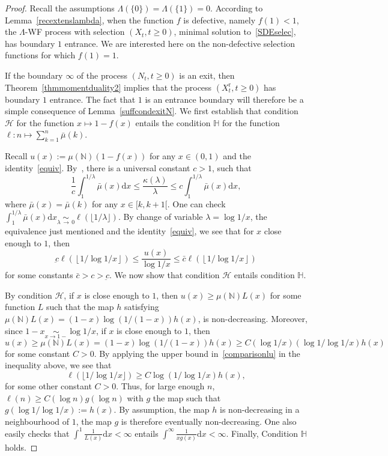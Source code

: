 \documentclass[10pt]{amsart}
\theoremstyle{definition}\newtheorem{defi}[theo]{Definition}\newtheorem{rema}[theo]{Remark}\newtheorem{exam}[theo]{Example}\newtheorem{exem}[theo]{Example}\newtheorem{nota}[theo]{Notation}
\newcommand{\ddr}{\mathrm{d}}
\newcommand{\rmr}{\mathrm{r}}
\newcommand{\bbN}{\mathbb{N}}
\newcommand{\bbH}{\mathbb{H}}
\newcommand{\clH}{\mathcal{H}}
\begin{document}
\begin{proof}
Recall the assumptions $\Lambda(\{0\})=\Lambda(\{1\})=0$. According to Lemma~\ref{recextenslambda}, when the function $f$ is defective, namely $f(1)<1$, the $\Lambda$-WF process with selection $(X_t,t\geq 0)$, minimal solution to~\eqref{SDEselec}, has boundary $1$ entrance. We are interested here on the non-defective selection functions for which $f(1)=1$.


If the boundary $\infty$ of the process $(N_t,t\geq 0)$ is an exit, then Theorem~\ref{thmmomentduality2} implies that the process $(X_t^{\rmr},t\geq 0)$ has boundary $1$ entrance. The fact that $1$ is an entrance boundary will therefore be a simple consequence of Lemma~\ref{suffcondexitN}. We first establish that condition $\clH$ for the function $x\mapsto 1-f(x)$ entails the condition $\bbH$ for the function $\ell :n\mapsto \sum_{k=1}^{n}\bar{\mu}(k)$.

Recall $u(x):=\mu(\bbN)(1-f(x))$ for any $x\in (0,1)$ and the identity~\eqref{equiv}. By~\cite[Proposition~1, Chapter~III]{Bertoin96}, there is a universal constant $c>1$, such that
\[
\frac{1}{c}\int_{1}^{1/\lambda}\bar{\mu}(x)\ddr x \leq \frac{\kappa(\lambda)}{\lambda}\leq c \int_{1}^{1/\lambda}\bar{\mu}(x)\ddr x,
\]
where $\bar{\mu}(x)=\bar{\mu}(k)$ for any $x\in [k,k+1[$. One can check $\int_{1}^{1/\lambda}\bar{\mu}(x)\ddr x \underset{\lambda\,\rightarrow\,0}{\sim} \ell(\lfloor 1/\lambda \rfloor).$ By change of variable $\lambda=\log 1/x$, the equivalence just mentioned and the identity~\eqref{equiv}, we see that for $x$ close enough to $1$, then
\begin{equation}\label{comparisonlu}
\underbar c \ell\left(\left \lfloor 1/\log 1/x \right \rfloor \right)\leq \frac{u(x)}{\log 1/x}\leq \bar c \ell\left(\left \lfloor 1/\log 1/x \right \rfloor \right)
\end{equation}
for some constants $\bar c>c>\underbar c $. We now show that condition $\clH$ entails condition $\bbH$.

By condition $\clH$, if $x$ is close enough to $1$, then $u(x)\geq \mu(\bbN)L(x)$ for some function $L$ such that the map $h$ satisfying $\mu(\bbN)L(x)=(1-x)\log\left(1/(1-x)\right) h(x)$, is non-decreasing. Moreover, since $1-x \underset{x\rightarrow 1-}{\sim} \log 1/x$, if $x$ is close enough to $1$, then
\[
u(x)\geq \mu(\bbN)L(x)=(1-x)\log\left(1/(1-x)\right) h(x) \geq C(\log 1/x) (\log 1/\log 1/x) h(x)
\]
for some constant $C>0$. By applying the upper bound in~\eqref{comparisonlu} in the inequality above, we see that
\[
\ell\left(\lfloor 1/\log 1/x \rfloor \right)\geq C\log(1/\log 1/x) h(x),
\]
for some other constant $C>0$. Thus, for large enough $n$,
$\ell(n)\geq C(\log n)g(\log n)$ with $g$ the map such that $g(\log 1/\log 1/x):=h(x)$. By assumption, the map $h$ is non-decreasing in a neighbourhood of $1$, the map $g$ is therefore eventually non-decreasing. One also easily checks that $\int^{1}\frac{1}{L(x)}\ddr x<\infty$ entails $\int^{\infty}\frac{1}{xg(x)}\ddr x<\infty$. Finally, Condition $\bbH$ holds.


\end{proof}
\end{document}
